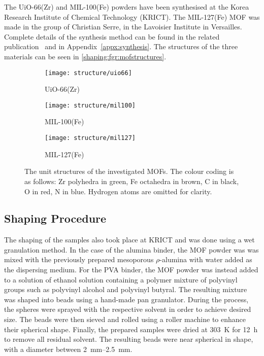 The UiO-66(Zr) and MIL-100(Fe) powders have been synthesised at the
Korea Research Institute of Chemical Technology (KRICT).
The MIL-127(Fe) MOF was made in the group of Christian Serre,
in the Lavoisier Institute in Versailles.
Complete details of the synthesis method can be found in the related
publication~\cite{valekarShapingPorousMetal2017}
and in Appendix~\ref{appx:synthesis}.
The structures of the three materials can be seen
in \autoref{shaping:fgr:mofstructures}.

\begin{figure}[htb]
	\centering
	\begin{subfigure}[b]{0.3\textwidth}
		\texttt{[image: structure/uio66]}
		\caption{UiO-66(Zr)}
	\end{subfigure}%
	\begin{subfigure}[b]{0.3\textwidth}
		\texttt{[image: structure/mil100]}
		\caption{MIL-100(Fe)}
	\end{subfigure}%
	\begin{subfigure}[b]{0.3\textwidth}
		\texttt{[image: structure/mil127]}
		\caption{MIL-127(Fe)}
	\end{subfigure}%

	\caption{The unit structures of the investigated MOFs.
		The colour coding is as follows: Zr polyhedra in green,
		Fe octahedra in brown, C in black, O in red, N in blue.
		Hydrogen atoms are omitted for clarity.}%
	\label{shaping:fgr:mofstructures}
\end{figure}

\subsection{Shaping Procedure}

The shaping of the samples also took place at KRICT and was done
using a wet granulation method. In the case of the alumina binder,
the MOF powder was was mixed with the previously prepared mesoporous
\(\rho\)-alumina with water added as the dispersing medium. For the
PVA binder, the MOF powder was instead added to a solution of
ethanol solution containing a polymer mixture of polyvinyl groups
such as polyvinyl alcohol and polyvinyl butyral. The resulting
mixture was shaped into beads using a hand-made pan granulator.
During the process, the spheres were sprayed with the respective
solvent in order to achieve desired size. The beads were then sieved
and rolled using a roller machine to enhance their spherical
shape. Finally, the prepared samples were dried at \SI{303}{\kelvin}
for \SI{12}{\hour} to remove all residual solvent.
The resulting beads were near spherical in shape, with a diameter
between \SIrange{2}{2.5}{\milli\metre}.

